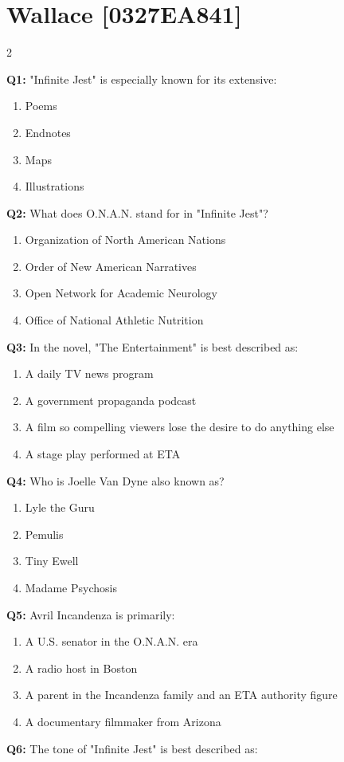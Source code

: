 \documentclass[10pt]{article}
\begin{document}
\section*{Wallace \footnotesize [0327EA841]}
\begin{multicols}{2}

\textbf{Q1:} "Infinite Jest" is especially known for its extensive:

\begin{enumerate}[label=\arabic*.]
\item Poems
\item Endnotes
\item Maps
\item Illustrations
\end{enumerate}
\textbf{Q2:} What does O.N.A.N. stand for in "Infinite Jest"?

\begin{enumerate}[label=\arabic*.]
\item Organization of North American Nations
\item Order of New American Narratives
\item Open Network for Academic Neurology
\item Office of National Athletic Nutrition
\end{enumerate}
\textbf{Q3:} In the novel, "The Entertainment" is best described as:

\begin{enumerate}[label=\arabic*.]
\item A daily TV news program
\item A government propaganda podcast
\item A film so compelling viewers lose the desire to do anything else
\item A stage play performed at ETA
\end{enumerate}
\textbf{Q4:} Who is Joelle Van Dyne also known as?

\begin{enumerate}[label=\arabic*.]
\item Lyle the Guru
\item Pemulis
\item Tiny Ewell
\item Madame Psychosis
\end{enumerate}
\textbf{Q5:} Avril Incandenza is primarily:

\begin{enumerate}[label=\arabic*.]
\item A U.S. senator in the O.N.A.N. era
\item A radio host in Boston
\item A parent in the Incandenza family and an ETA authority figure
\item A documentary filmmaker from Arizona
\end{enumerate}
\textbf{Q6:} The tone of "Infinite Jest" is best described as:


\end{multicols}
\end{document}
